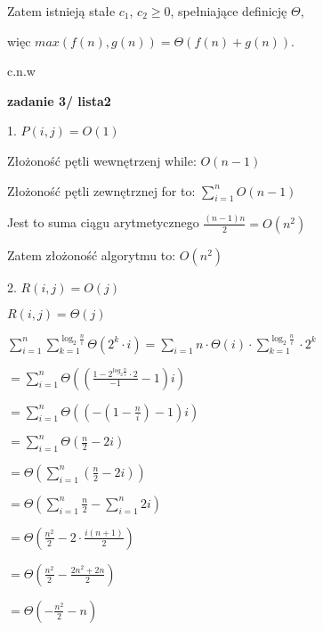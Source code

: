 \documentclass{article}
\begin{document}
    Zatem istnieją stałe $c_1$, $c_2 \geq 0$, spełniające definicję $\Theta$, \par
    więc $max(f(n), g(n)) = \Theta(f(n) + g(n))$. \par
    \par
    c.n.w \par
    \vspace{1\baselineskip}
    \textbf{zadanie 3/ lista2} \par
    1. $P(i, j) = O(1)$ \par
    Złożoność pętli wewnętrzenj while: $O(n - 1)$ \par
    Złożoność pętli zewnętrznej for to: $\sum_{i = 1}^{n} O(n-1)$ \par
    Jest to suma ciągu arytmetycznego $\frac{(n-1)n}{2} = O(n^2)$ \par
    Zatem złożoność algorytmu to: $O(n^2)$ \par
    \vspace{1\baselineskip}
    2. $R(i, j) = O(j)$ \par
    $R(i, j) = \Theta (j)$ \par
    $\sum_{i=1}^{n} \sum_{k=1}^{\log_2{\frac{n}{i}}} \Theta(2^k \cdot i) = \sum_{i=1}{n} \cdot \Theta (i) \cdot \sum_{k=1}^{\log_2{\frac{n}{i}}} \cdot 2^k $\par
    $= \sum_{i=1}^{n} \Theta ((\frac{1 - 2^{log_2 \frac{n}{i}} \cdot 2}{-1} -1)i)$ \par
    $= \sum_{i=1}^{n} \Theta ((-(1- \frac{n}{i}) - 1) i)$ \par
    $= \sum_{i=1}^{n} \Theta (\frac{n}{2} - 2i)$ \par
    $= \Theta (\sum_{i=1}^{n} (\frac{n}{2} - 2i))$ \par
    $= \Theta (\sum_{i=1}^{n} \frac{n}{2} - \sum_{i=1}^{n} 2i)$ \par
    $= \Theta (\frac{n^2}{2} - 2 \cdot \frac{i(n+1)}{2})$ \par
    $= \Theta (\frac{n^2}{2} - \frac{2n^2 + 2n}{2})$ \par
    $= \Theta (- \frac{n^2}{2} - n)$ 
\end{document}
